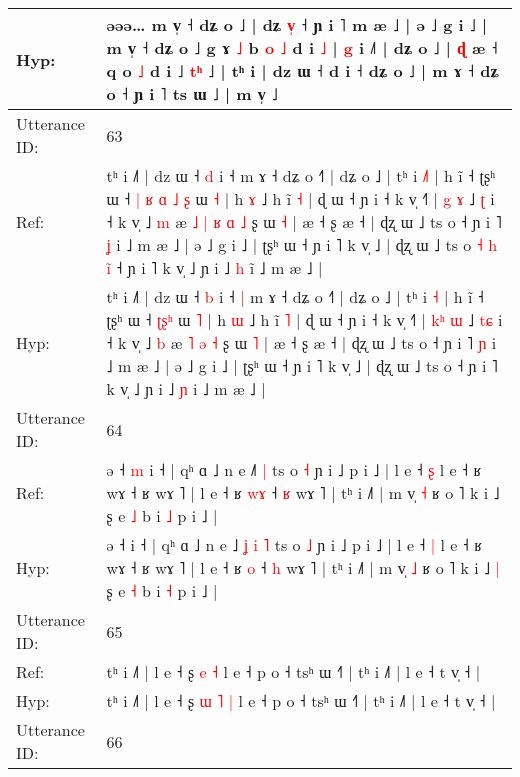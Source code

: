 \documentclass[10pt]{article}
\DeclareRobustCommand{\hl}[1]{{\textcolor{red}{#1}}}
\begin{document}
\begin{longtable}{ll}
Hyp: & əəə… m v̩ ˧ dʑ o ˩ | dʑ \hl{v}\hl{̩} ˧ ɲ i ˥\hl{}\hl{}\hl{}\hl{}\hl{}\hl{} m æ ˩ | ə ˩ g i ˩ | m v̩ ˧ dʑ o ˩\hl{}\hl{} g ɤ \hl{˩} b \hl{o} \hl{˩} d i \hl{˩} | \hl{g} i ˩˥ | dʑ o ˩ | \hl{ɖ} æ ˧ q o \hl{˩} d i ˩ \hl{}\hl{}\hl{t}\hl{ʰ} ˩ | tʰ i\hl{}\hl{}\hl{} | dz ɯ ˧ d i ˧\hl{}\hl{}\hl{} dʑ o ˩ | m ɤ ˧ dʑ o ˧ ɲ i ˥ ts ɯ ˩ | m v̩ ˩
 \\
\midrule
Utterance ID: & 63 \\
Ref: & tʰ i ˩˥ | dz ɯ ˧ \hl{d} i ˧\hl{}\hl{} m ɤ ˧ dʑ o ˧˥ | dʑ o ˩ | tʰ i \hl{˩}\hl{˥} | h ĩ ˧ ʈʂʰ ɯ ˧\hl{ }\hl{|}\hl{ }\hl{ʁ}\hl{ }\hl{ɑ} \hl{˩}\hl{ }\hl{ʂ} ɯ \hl{˧} | h \hl{ɤ} ˩ h ĩ \hl{˧} | ɖ ɯ ˧ ɲ i ˧ k v̩ ˧˥ | \hl{}\hl{g} \hl{ɤ} ˩ \hl{}\hl{ʈ} i ˧ k v̩ ˩ \hl{m} æ\hl{ }\hl{˩}\hl{ }\hl{|} \hl{ʁ} \hl{ɑ} \hl{˩} ʂ ɯ \hl{˧} | æ ˧ ʂ æ ˧ | ɖʐ ɯ ˩ ts o ˧ ɲ i ˥ \hl{ʝ} i ˩ m æ ˩ | ə ˩ g i ˩ | ʈʂʰ ɯ ˧ ɲ i ˥ k v̩ ˩ | ɖʐ ɯ ˩ ts o\hl{ }\hl{˧}\hl{ }\hl{h}\hl{ }\hl{i}\hl{̃} ˧ ɲ i ˥ k v̩ ˩ ɲ i ˩ \hl{h} i\hl{̃} ˩ m æ ˩ |
 \\
Hyp: & tʰ i ˩˥ | dz ɯ ˧ \hl{b} i ˧\hl{ }\hl{|} m ɤ ˧ dʑ o ˧˥ | dʑ o ˩ | tʰ i \hl{}\hl{˧} | h ĩ ˧ ʈʂʰ ɯ ˧\hl{}\hl{}\hl{}\hl{}\hl{}\hl{} \hl{ʈ}\hl{ʂ}\hl{ʰ} ɯ \hl{˥} | h \hl{ɯ} ˩ h ĩ \hl{˥} | ɖ ɯ ˧ ɲ i ˧ k v̩ ˧˥ | \hl{k}\hl{ʰ} \hl{ɯ} ˩ \hl{t}\hl{ɕ} i ˧ k v̩ ˩ \hl{b} æ\hl{}\hl{}\hl{}\hl{} \hl{˥} \hl{ə} \hl{˧} ʂ ɯ \hl{˥} | æ ˧ ʂ æ ˧ | ɖʐ ɯ ˩ ts o ˧ ɲ i ˥ \hl{ɲ} i ˩ m æ ˩ | ə ˩ g i ˩ | ʈʂʰ ɯ ˧ ɲ i ˥ k v̩ ˩ | ɖʐ ɯ ˩ ts o\hl{}\hl{}\hl{}\hl{}\hl{}\hl{}\hl{} ˧ ɲ i ˥ k v̩ ˩ ɲ i ˩ \hl{ɲ} i\hl{} ˩ m æ ˩ |
 \\
\midrule
Utterance ID: & 64 \\
Ref: & ə ˧\hl{ }\hl{m} i ˧ | qʰ ɑ ˩ n e ˩\hl{}\hl{}\hl{}\hl{˥} \hl{|} ts o \hl{˧} ɲ i ˩ p i ˩ | l e ˧ \hl{ʂ} l e ˧ ʁ wɤ ˧ ʁ wɤ ˥ | l e ˧ ʁ \hl{w}\hl{ɤ} ˧ \hl{ʁ} wɤ ˥ | tʰ i ˩˥ | m v̩ \hl{˧} ʁ o ˥ k i ˩\hl{}\hl{} ʂ e \hl{˩} b i \hl{˩} p i ˩ |
 \\
Hyp: & ə ˧\hl{}\hl{} i ˧ | qʰ ɑ ˩ n e ˩\hl{ }\hl{ʝ}\hl{ }\hl{i} \hl{˥} ts o \hl{˩} ɲ i ˩ p i ˩ | l e ˧ \hl{|} l e ˧ ʁ wɤ ˧ ʁ wɤ ˥ | l e ˧ ʁ \hl{}\hl{o} ˧ \hl{h} wɤ ˥ | tʰ i ˩˥ | m v̩ \hl{˩} ʁ o ˥ k i ˩\hl{ }\hl{|} ʂ e \hl{˧} b i \hl{˧} p i ˩ |
 \\
\midrule
Utterance ID: & 65 \\
Ref: & tʰ i ˩˥ | l e ˧ ʂ\hl{}\hl{} \hl{e} \hl{˧} l e ˧ p o ˧ tsʰ ɯ ˧˥ | tʰ i ˩˥ | l e ˧ t v̩ ˧ |
 \\
Hyp: & tʰ i ˩˥ | l e ˧ ʂ\hl{ }\hl{ɯ} \hl{˥} \hl{|} l e ˧ p o ˧ tsʰ ɯ ˧˥ | tʰ i ˩˥ | l e ˧ t v̩ ˧ |
 \\
\midrule
Utterance ID: & 66 \\

\end{longtable}
\end{document}
